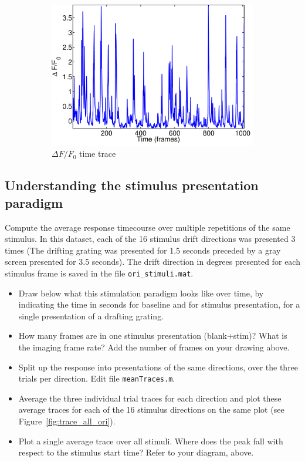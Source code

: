 \documentclass[paper=a4, fontsize=11pt]{scrartcl} %
\numberwithin{equation}{section} %
\numberwithin{figure}{section} %
\numberwithin{table}{section} %
\begin{document}
\begin{figure}
\begin{subfigure}[b]{0.3\textwidth}
    \includegraphics[width=\textwidth]{../MATLAB_complete/trace_delta_f_f0.pdf}
    \caption{$\Delta F/F_0$ time trace}
    \label{fig:time_trace_dff0}
    \end{subfigure}
    
    \caption{}
\end{figure}

\subsection{Understanding the stimulus presentation paradigm}
Compute the average response timecourse over multiple repetitions of the same stimulus. In this dataset, each of the 16 stimulus drift directions was presented 3 times (The drifting grating was presented for 1.5 seconds preceded by a gray screen presented for 3.5 seconds). The drift direction in degrees presented for each stimulus frame is saved in the file \texttt{ori\_stimuli.mat}.

\begin{itemize}
\setlength{\parskip}{0.25em}
\item Draw below what this stimulation paradigm looks like over time, by indicating the time in seconds for baseline and for stimulus presentation, for a single presentation of a drafting grating.\vspace{3in}
\item How many frames are in one stimulus presentation (blank+stim)? What is the imaging frame rate? Add the number of frames on your drawing above.
\item Split up the response into presentations of the same directions, over the three trials per direction. Edit file \texttt{meanTraces.m}.
\item Average the three individual trial traces for each direction and plot these average traces for each of the 16 stimulus directions on the same plot (see Figure~\ref{fig:trace_all_ori}).
\item Plot a single average trace over all stimuli. Where does the peak fall with respect to the stimulus start time? Refer to your diagram, above.
\end{itemize}
\end{document}
